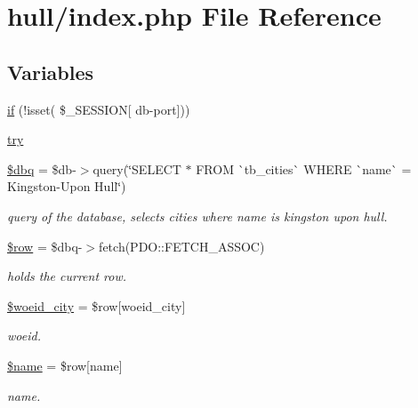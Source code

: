 \hypertarget{hull_2index_8php}{}\section{hull/index.php File Reference}
\label{hull_2index_8php}
\subsection*{Variables}
\begin{DoxyCompactItemize}
\item 
\mbox{\hyperlink{hull_2index_8php_a8f0d8893361d6307986497540738a8bf}{if}} (!isset( \$\+\_\+\+S\+E\+S\+S\+I\+ON\mbox{[} \textquotesingle{}db-\/port\textquotesingle{}\mbox{]}))
\item 
\mbox{\hyperlink{hull_2index_8php_abe4cc9788f52e49485473dc699537388}{try}}
\item 
\mbox{\hyperlink{hull_2index_8php_ab76933014035168a37e7e525ca8fbabe}{\$dbq}} = \$db-\/$>$query(\char`\"{}S\+E\+L\+E\+CT $\ast$ F\+R\+OM \`{}tb\+\_\+cities\`{} W\+H\+E\+RE \`{}name\`{} = \textquotesingle{}Kingston-\/Upon Hull\textquotesingle{}\char`\"{})
\begin{DoxyCompactList}\small\item\em query of the database, selects cities where name is kingston upon hull. \end{DoxyCompactList}\item 
\mbox{\hyperlink{hull_2index_8php_aa1d731aa570613e5bcff831bb10e9b87}{\$row}} = \$dbq-\/$>$fetch(P\+D\+O\+::\+F\+E\+T\+C\+H\+\_\+\+A\+S\+S\+OC)
\begin{DoxyCompactList}\small\item\em holds the current row. \end{DoxyCompactList}\item 
\mbox{\hyperlink{hull_2index_8php_a34dc977e0c4838f8c2d423849ad9ff02}{\$woeid\+\_\+city}} = \$row\mbox{[}\textquotesingle{}woeid\+\_\+city\textquotesingle{}\mbox{]}
\begin{DoxyCompactList}\small\item\em woeid. \end{DoxyCompactList}\item 
\mbox{\hyperlink{hull_2index_8php_ab2fc40d43824ea3e1ce5d86dee0d763b}{\$name}} = \$row\mbox{[}\textquotesingle{}name\textquotesingle{}\mbox{]}
\begin{DoxyCompactList}\small\item\em name. \end{DoxyCompactList}\item 

\end{DoxyCompactItemize}
